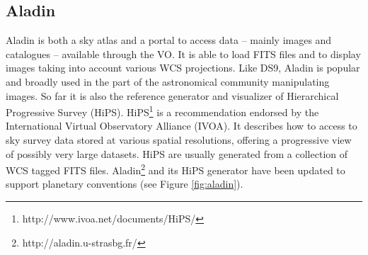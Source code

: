 \subsection{Aladin}
Aladin is both a sky atlas and a portal to access data -- mainly images and
catalogues -- available through the VO.
It is able to load FITS files and to display images taking into account various
WCS projections.
Like DS9, Aladin is popular and broadly used in the part of the astronomical
community manipulating images.
So far it is also the reference generator and visualizer of Hierarchical
Progressive Survey (HiPS).
HiPS\footnote{http://www.ivoa.net/documents/HiPS/} is a recommendation endorsed
by the International Virtual Observatory Alliance (IVOA).
It describes how to access to sky survey data stored at various spatial
resolutions, offering a progressive view of possibly very large datasets.
HiPS are usually generated from a collection of WCS tagged FITS files.
Aladin\footnote{http://aladin.u-strasbg.fr/} \citep{aladin} and its HiPS generator have
been updated to support planetary conventions (see Figure \ref{fig:aladin}).

